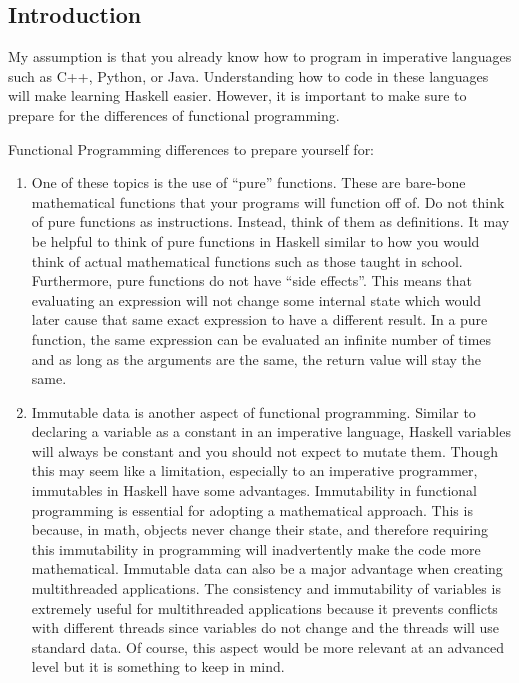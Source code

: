 \documentclass{article}
\begin{document}
\subsection{Introduction}
\medskip\noindent
My assumption is that you already know how to program in imperative languages such as C++, Python, or Java. Understanding how to code in these languages will make learning Haskell easier. However, it is important to make sure to prepare for the differences of functional programming.

\medskip\noindent
Functional Programming differences to prepare yourself for:
\begin{enumerate}
  \item One of these topics is the use of “pure” functions. These are bare-bone mathematical functions that your programs will function off of. Do not think of pure functions as instructions. Instead, think of them as definitions. It may be helpful to think of pure functions in Haskell similar to how you would think of actual mathematical functions such as those taught in school. Furthermore, pure functions do not have “side effects”. This means that evaluating an expression will not change some internal state which would later cause that same exact expression to have a different result. In a pure function, the same expression can be evaluated an infinite number of times and as long as the arguments are the same, the return value will stay the same.
  
  \item Immutable data is another aspect of functional programming. Similar to declaring a variable as a constant in an imperative language, Haskell variables will always be constant and you should not expect to mutate them. Though this may seem like a limitation, especially to an imperative programmer, immutables in Haskell have some advantages. Immutability in functional programming is essential for adopting a mathematical approach. This is because, in math, objects never change their state, and therefore requiring this immutability in programming will inadvertently make the code more mathematical. Immutable data can also be a major advantage when creating multithreaded applications. The consistency and immutability of variables is extremely useful for multithreaded applications because it prevents conflicts with different threads since variables do not change and the threads will use standard data. Of course, this aspect would be more relevant at an advanced level but it is something to keep in mind.
  

\end{enumerate}
\end{document}

